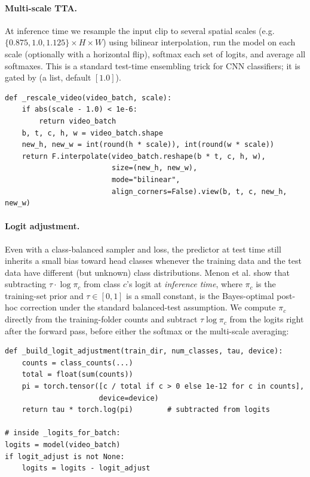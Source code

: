 \paragraph{Multi-scale TTA.} At inference time we resample the input
clip to several spatial scales (e.g. \(\{0.875, 1.0, 1.125\} \times
H \times W\)) using bilinear interpolation, run the model on each
scale (optionally with a horizontal flip), softmax each set of
logits, and average all softmaxes. This is a standard test-time
ensembling trick for CNN classifiers; it is gated by
 (a list, default \([1.0]\)).

\begin{lstlisting}[style=py]
def _rescale_video(video_batch, scale):
    if abs(scale - 1.0) < 1e-6:
        return video_batch
    b, t, c, h, w = video_batch.shape
    new_h, new_w = int(round(h * scale)), int(round(w * scale))
    return F.interpolate(video_batch.reshape(b * t, c, h, w),
                         size=(new_h, new_w),
                         mode="bilinear",
                         align_corners=False).view(b, t, c, new_h, new_w)
\end{lstlisting}

\paragraph{Logit adjustment.} Even with a class-balanced sampler and
loss, the predictor at test time still inherits a small bias toward
head classes whenever the training data and the test data have
different (but unknown) class distributions. Menon et al.
\cite{Menon2021LA} show that subtracting \(\tau \cdot \log \pi_c\) from
class \(c\)'s logit at \emph{inference time}, where \(\pi_c\) is the
training-set prior and \(\tau \in [0, 1]\) is a small constant, is the
Bayes-optimal post-hoc correction under the standard balanced-test
assumption. We compute \(\pi_c\) directly from the training-folder
counts and subtract \(\tau \log \pi_c\) from the logits right after the
forward pass, before either the softmax or the multi-scale averaging:

\begin{lstlisting}[style=py]
def _build_logit_adjustment(train_dir, num_classes, tau, device):
    counts = class_counts(...)
    total = float(sum(counts))
    pi = torch.tensor([c / total if c > 0 else 1e-12 for c in counts],
                      device=device)
    return tau * torch.log(pi)        # subtracted from logits

# inside _logits_for_batch:
logits = model(video_batch)
if logit_adjust is not None:
    logits = logits - logit_adjust
\end{lstlisting}

